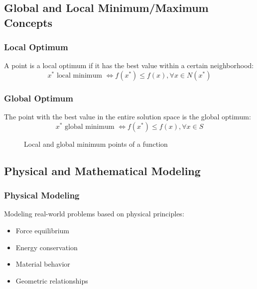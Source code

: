 \subsection{Global and Local Minimum/Maximum Concepts}

\subsubsection{Local Optimum}
A point is a local optimum if it has the best value within a certain neighborhood:
\begin{equation}
x^* \text{ local minimum } \Leftrightarrow f(x^*) \leq f(x), \forall x \in N(x^*)
\end{equation}

\subsubsection{Global Optimum}
The point with the best value in the entire solution space is the global optimum:
\begin{equation}
x^* \text{ global minimum } \Leftrightarrow f(x^*) \leq f(x), \forall x \in S
\end{equation}

\begin{figure}
\centering
{}
\caption{Local and global minimum points of a function}
\label{fig:local_global}
\end{figure}

\subsection{Physical and Mathematical Modeling}

\subsubsection{Physical Modeling}
Modeling real-world problems based on physical principles:
\begin{itemize}
    \item Force equilibrium
    \item Energy conservation
    \item Material behavior
    \item Geometric relationships
\end{itemize}

